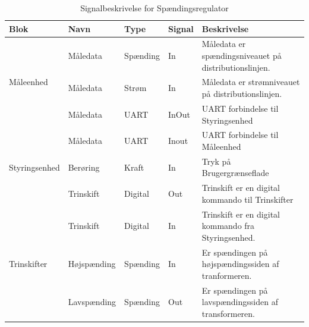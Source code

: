 \begin{table}[H]
	\centering
	\begin{tabular}{|l|l|l|l|p{4cm}|}
		\hline
		\textbf{Blok} & \textbf{Navn} & \textbf{Type} & \textbf{Signal} & 
		\textbf{Beskrivelse} \\\hline
		
		\multirow{3}{*}{Måleenhed} 
		& Måledata & Spænding & In & Måledata er spændingsniveauet på distributionslinjen. \\\hhline{~----} 
		& Måledata & Strøm & In & Måledata er strømniveauet på distributionslinjen. \\\hhline{~----} 
		& Måledata & UART & InOut & UART forbindelse til Styringsenhed \\\hline
		
		\multirow{3}{*}{Styringsenhed} 
		& Måledata & UART & Inout & UART forbindelse til Måleenhed \\\hhline{~----} 
		& Berøring & Kraft & In & Tryk på Brugergrænseflade \\\hhline{~----} 
		& Trinskift & Digital & Out & Trinskift er en digital kommando til Trinskifter \\\hline
	
		\multirow{3}{*}{Trinskifter} 
		& Trinskift & Digital & In & Trinskift er en digital kommando fra Styringsenhed. \\\hhline{~----} 
		& Højspænding & Spænding & In & Er spændingen på højspændingssiden af tranformeren. \\\hhline{~----} 
		& Lavspænding & Spænding & Out & Er spændingen på lavspændingssiden af transformeren. \\\hline
	\end{tabular}
	\caption{Signalbeskrivelse for Spændingsregulator}
	\label{tab:SignalbeskrivelseSp}
	
\end{table}

